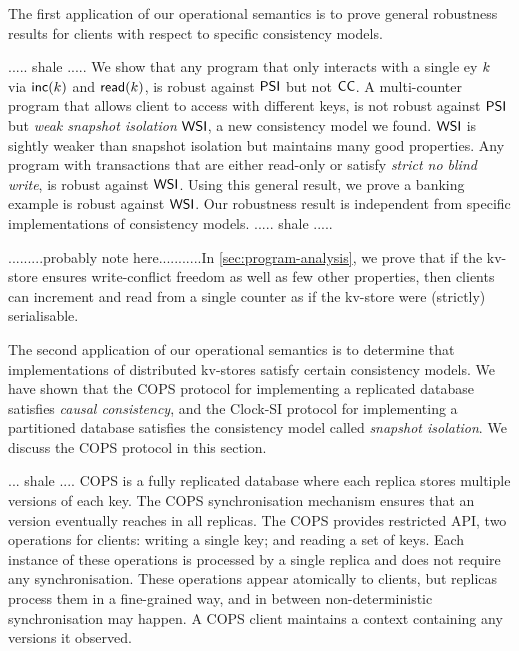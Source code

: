 
The first application of our operational semantics is to prove
general robustness results for clients with respect to specific
consistency models. 

..... shale .....
We show that any program that only interacts with  
a single ey \( k \) via \( \mathsf{inc}(k)\) and \( \mathsf{read}(k)\),
is robust against \( \mathsf{PSI} \) but not \( \mathsf{CC} \).
A multi-counter program that allows client to access with different keys, is not robust against 
\( \mathsf{PSI} \) but \emph{weak snapshot isolation} \( \mathsf{WSI} \), 
a new consistency model we found.
\( \mathsf{WSI} \) is sightly weaker than snapshot isolation but maintains many good properties.
Any program with transactions that are either read-only or satisfy \emph{strict no blind write},
is robust against \( \mathsf{WSI} \).
Using this general result, 
we prove a banking example \cite{bank-example-wsi} is robust against \( \mathsf{WSI} \).
Our robustness result is independent from specific implementations of consistency models.
..... shale .....


.........probably note here...........In \cref{sec:program-analysis}, we prove that if the kv-store 
ensures write-conflict freedom as well as few other properties, then clients can increment 
and read from a single counter as if the kv-store were (strictly) serialisable.



The second application of our operational
semantics is to determine that implementations of distributed
kv-stores satisfy certain consistency models. We have shown that the
COPS protocol \citep{cops} for implementing a replicated database satisfies {\em
  causal consistency},  and the Clock-SI protocol \citep{clocksi} for implementing a
partitioned database satisfies the consistency model called {\em
  snapshot isolation}. We discuss the  COPS protocol  in this section. 

... shale ....
COPS is a fully replicated database where each replica stores multiple versions of each key. 
The COPS synchronisation mechanism ensures that an version eventually reaches in all replicas.
The COPS provides restricted API, two operations for clients: 
writing a single key; and reading a set of keys. 
Each instance of these operations is processed by a single replica and does not require any synchronisation.
These operations appear atomically to clients, but replicas process them in a fine-grained way,
and in between non-deterministic synchronisation may happen.
A COPS client maintains a context containing any versions it observed.

